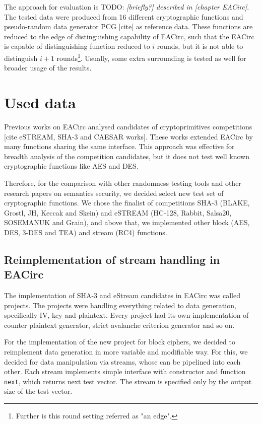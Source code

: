 \documentclass[
  print, %
  Table,   %
  nolof,     %
  nolot,     %
  11pt, %
  oneside  %
]{fithesis3}
\newcommand{\todo}[1]{TODO: \textit{#1}}
\begin{document}
The approach for evaluation is \todo{[briefly?] described in [chapter EACirc]}. The tested data were produced from 16 different cryptographic functions and pseudo-random data generator PCG [cite] as reference data. These functions are reduced to the edge of distinguishing capability of EACirc, such that the EACirc is capable of distinguishing function reduced to $i$ rounds, but it is not able to distinguish $i+1$ rounds\footnote{Further is this round setting referred as "an edge".}. Usually, some extra surrounding is tested as well for broader usage of the results.

\section{Used data}

Previous works on EACirc analysed candidates of cryptoprimitives competitions [cite eSTREAM, SHA-3 and CAESAR works]. These works extended EACirc by many functions sharing the same interface. This approach was effective for breadth analysis of the competition candidates, but it does not test well known cryptographic functions like AES and DES.

Therefore, for the comparison with other randomness testing tools and other research papers on semantics security, we decided select new test set of cryptographic functions. We chose the finalist of competitions SHA-3 (BLAKE, Grostl, JH, Keccak and Skein) and eSTREAM (HC-128, Rabbit, Salsa20, SOSEMANUK and Grain), and above that, we implemented other block (AES, DES, 3-DES and TEA) and stream (RC4) functions.

\subsection{Reimplementation of stream handling in EACirc}

The implementation of SHA-3 and eStream candidates in EACirc was called projects. The projects were handling everything related to data generation, specifically IV, key and plaintext. Every project had its own implementation of counter plaintext generator, strict avalanche criterion generator and so on.

For the implementation of the new project for block ciphers, we decided to reimplement data generation in more variable and modifiable way. For this, we decided for data manipulation via streams, whose can be pipelined into each other. Each stream implements simple interface with constructor and function \texttt{next}, which returns next test vector. The stream is specified only by the output size of the test vector.
\end{document}
